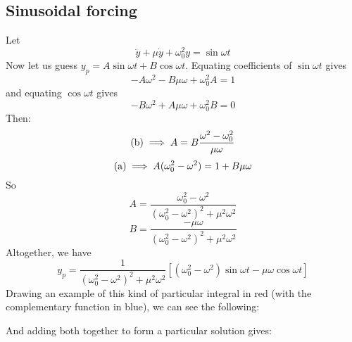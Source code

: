 \subsection{Sinusoidal forcing}
Let
\[
	\ddot y + \mu \dot y + \omega_0^2 y = \sin \omega t
\]
Now let us guess \(y_p = A\sin \omega t + B\cos \omega t\).
Equating coefficients of \(\sin\omega t\) gives
\[
	-A\omega^2 - B\mu\omega + \omega_0^2A = 1 \tag{a}
\]
and equating \(\cos\omega t\) gives
\[
	-B\omega^2 + A\mu\omega + \omega_0^2B = 0 \tag{b}
\]
Then:
\[
	(\text b) \implies A = B \frac{\omega^2 - \omega_0^2}{\mu\omega}
\]
\[
	(\text a) \implies A(\omega_0^2 - \omega^2) = 1 + B\mu\omega
\]
So
\[
	A = \frac{\omega_0^2 - \omega^2}{(\omega_0^2 - \omega^2)^2 + \mu^2\omega^2}
\]
\[
	B = \frac{-\mu\omega}{(\omega_0^2 - \omega^2)^2 + \mu^2\omega^2}
\]
Altogether, we have
\[
	y_p = \frac{1}{(\omega_0^2 - \omega^2)^2 + \mu^2\omega^2}\left[ (\omega_0^2 - \omega^2)\sin\omega t - \mu \omega \cos \omega t \right]
\]
Drawing an example of this kind of particular integral in red (with the complementary function in blue), we can see the following:\medskip


\noindent And adding both together to form a particular solution gives:\medskip


